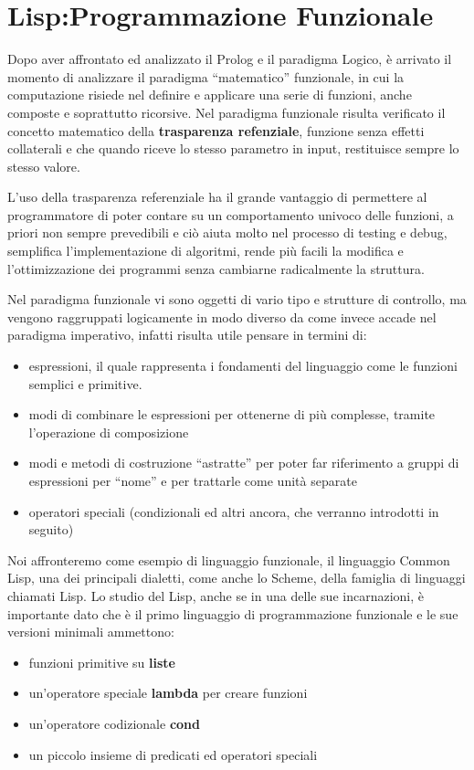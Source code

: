 \documentclass[a4paper]{book}
\begin{document}
\chapter{Lisp:Programmazione Funzionale}
Dopo aver affrontato ed analizzato il Prolog e il paradigma Logico, è arrivato il momento di analizzare il paradigma ``matematico'' funzionale,
in cui la computazione risiede nel definire e applicare una serie di funzioni, anche composte e soprattutto ricorsive.\newline
Nel paradigma funzionale risulta verificato il concetto matematico della \textbf{trasparenza refenziale}, funzione senza effetti collaterali
e che quando riceve lo stesso parametro in input, restituisce sempre lo stesso valore.

L'uso della trasparenza referenziale ha il grande vantaggio di permettere al programmatore di poter contare su un comportamento
univoco delle funzioni, a priori non sempre prevedibili e ciò aiuta molto nel processo di testing e debug,
semplifica l'implementazione di algoritmi, rende più facili la modifica e l'ottimizzazione dei programmi senza cambiarne radicalmente la struttura.

Nel paradigma funzionale vi sono oggetti di vario tipo e strutture di controllo, ma vengono raggruppati logicamente in modo diverso
da come invece accade nel paradigma imperativo, infatti risulta utile pensare in termini di:
\begin{itemize}
\item espressioni, il quale rappresenta i fondamenti del linguaggio come le funzioni semplici e primitive.
\item modi di combinare le espressioni per ottenerne di più complesse, tramite l'operazione di composizione
\item modi e metodi di costruzione ``astratte''  per poter far riferimento a gruppi di espressioni per “nome” e per trattarle come unità separate
\item operatori speciali (condizionali ed altri ancora, che verranno introdotti in seguito)
\end{itemize}

Noi affronteremo come esempio di linguaggio funzionale, il linguaggio Common Lisp, una dei principali dialetti, come anche lo Scheme, della famiglia
di linguaggi chiamati Lisp.\newline
Lo studio del Lisp, anche se in una delle sue incarnazioni, è importante dato che è il primo linguaggio di programmazione funzionale e
le sue versioni minimali ammettono:
\begin{itemize}
\item funzioni primitive su \textbf{liste}
\item un'operatore speciale \textbf{lambda} per creare funzioni
\item un'operatore codizionale \textbf{cond}
\item un piccolo insieme di predicati ed operatori speciali
\end{itemize}
\end{document}
